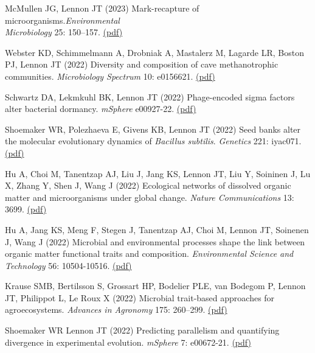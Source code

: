 \documentclass[11pt]{article}
\begin{document}
\begin{etaremune}
\item McMullen JG, Lennon JT (2023) Mark-recapture of microorganisms.\textit{Environmental \\ Microbiology} 25: 150–157. \href{https://lennonlab.github.io/assets/publications/McMullen_Lennon_2023.pdf}{(pdf)}

\item Webster KD, Schimmelmann A, Drobniak A, Mastalerz M, Lagarde LR, Boston PJ, Lennon JT (2022) Diversity and composition of cave methanotrophic communities. \textit{Microbiology Spectrum} 10: e0156621. \href{https://lennonlab.github.io/assets/publications/Webster_etal_2022.pdf}{(pdf)}

\item Schwartz DA, Lekmkuhl BK, Lennon JT (2022) Phage-encoded sigma factors alter bacterial dormancy. \textit{mSphere} e00927-22. \href{https://lennonlab.github.io/assets/publications/Schwartz_etal_2022.pdf}{(pdf)}

\item Shoemaker WR, Polezhaeva E, Givens KB, Lennon JT (2022) Seed banks alter the molecular evolutionary dynamics of \textit{Bacillus subtilis}. \textit{Genetics} 221: iyac071. \href{https://lennonlab.github.io/assets/publications/Shoemaker_etal_2022.pdf}{(pdf)}

\item Hu A, Choi M, Tanentzap AJ, Liu J, Jang KS, Lennon JT, Liu Y, Soininen J, Lu X, Zhang Y, Shen J, Wang J (2022) Ecological networks of dissolved organic matter and microorganisms under global change. \textit{Nature Communications} 13: 3699. \href{https://lennonlab.github.io/assets/publications/Hu_etal_2022a.pdf}{(pdf)}

\item Hu A, Jang KS, Meng F, Stegen J, Tanentzap AJ, Choi M, Lennon JT, Soinenen J, Wang J (2022) Microbial and environmental processes shape the link between organic matter functional traits and composition. \textit{Environmental Science and Technology} 56: 10504-10516. \href{https://lennonlab.github.io/assets/publications/Hu_etal_2022b.pdf}{(pdf)}

\item Krause SMB, Bertilsson S, Grossart HP, Bodelier PLE, van Bodegom P, Lennon JT, Philippot L, Le Roux X (2022) Microbial trait-based approaches for agroecosystems. \textit{Advances in Agronomy} 175: 260–299. \href{https://lennonlab.github.io/assets/publications/Krause_etal_2022.pdf}{(pdf)}

\item Shoemaker WR Lennon JT (2022) Predicting parallelism and quantifying divergence in experimental evolution. \textit{mSphere} 7: e00672-21. \href{https://lennonlab.github.io/assets/publications/Shoemaker_Lennon_2022.pdf}{(pdf)}


\end{etaremune}
\end{document}

